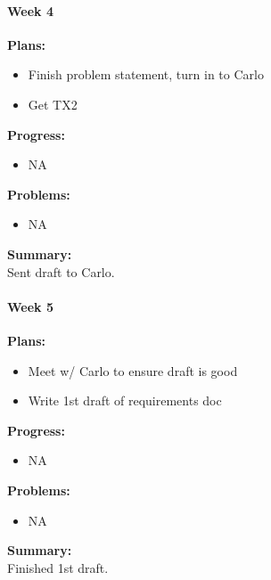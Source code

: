 \paragraph{Week 4}
\begin{adjustwidth}{2.5em}{0pt}
    \vspace{-0.5cm}\textbf{Plans:}
    \vspace{-0.5cm}
    \begin{itemize}
        \item Finish problem statement, turn in to Carlo
        \item Get TX2
    \end{itemize} 
    \vspace{-0.3cm}\textbf{Progress:}
    \vspace{-0.5cm}
    \begin{itemize}
        \item  NA
    \end{itemize} 
    \vspace{-0.3cm}\textbf{Problems:}
    \vspace{-0.5cm}
    \begin{itemize}
        \item  NA
    \end{itemize}  
    \vspace{-0.3cm}\noindent\textbf{Summary:}\\
    \noindent 
    Sent draft to Carlo.
\end{adjustwidth} 

\paragraph{Week 5}
\begin{adjustwidth}{2.5em}{0pt}
    \vspace{-0.5cm}\textbf{Plans:}
    \vspace{-0.5cm}
    \begin{itemize}
        \item Meet w/ Carlo to ensure draft is good
        \item Write 1st draft of requirements doc
    \end{itemize} 
    \vspace{-0.3cm}\textbf{Progress:}
    \vspace{-0.5cm}
    \begin{itemize}
        \item NA
    \end{itemize} 
    \vspace{-0.3cm}\textbf{Problems:}
    \vspace{-0.5cm}
    \begin{itemize}
        \item NA
    \end{itemize}  
    \vspace{-0.3cm}\noindent\textbf{Summary:}\\
    \noindent 
    Finished 1st draft.
\end{adjustwidth} 

